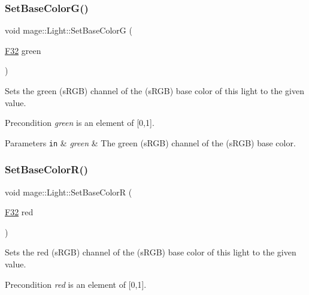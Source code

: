 \subsubsection{\texorpdfstring{Set\+Base\+Color\+G()}{SetBaseColorG()}}
{\footnotesize\ttfamily void mage\+::\+Light\+::\+Set\+Base\+ColorG (\begin{DoxyParamCaption}\item[{\hyperlink{namespacemage_aa97e833b45f06d60a0a9c4fc22ae02c0}{F32}}]{green }\end{DoxyParamCaption})\hspace{0.3cm}{\ttfamily [noexcept]}}

Sets the green (s\+R\+GB) channel of the (s\+R\+GB) base color of this light to the given value.

\begin{DoxyPrecond}{Precondition}
{\itshape green} is an element of \mbox{[}0,1\mbox{]}. 
\end{DoxyPrecond}

\begin{DoxyParams}[1]{Parameters}
\mbox{\tt in}  & {\em green} & The green (s\+R\+GB) channel of the (s\+R\+GB) base color. \\
\hline
\end{DoxyParams}
\hypertarget{classmage_1_1_light_a81ad30e15e54cb1e0c53cb860b9e29d1}{}\label{classmage_1_1_light_a81ad30e15e54cb1e0c53cb860b9e29d1} 
\subsubsection{\texorpdfstring{Set\+Base\+Color\+R()}{SetBaseColorR()}}
{\footnotesize\ttfamily void mage\+::\+Light\+::\+Set\+Base\+ColorR (\begin{DoxyParamCaption}\item[{\hyperlink{namespacemage_aa97e833b45f06d60a0a9c4fc22ae02c0}{F32}}]{red }\end{DoxyParamCaption})\hspace{0.3cm}{\ttfamily [noexcept]}}

Sets the red (s\+R\+GB) channel of the (s\+R\+GB) base color of this light to the given value.

\begin{DoxyPrecond}{Precondition}
{\itshape red} is an element of \mbox{[}0,1\mbox{]}. 
\end{DoxyPrecond}

